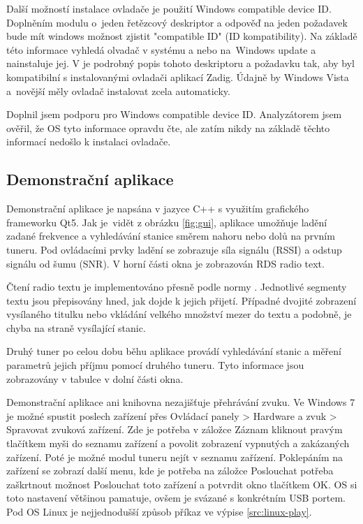 Další možností instalace ovladače je použití Windows compatible device ID. Doplněním modulu o~jeden řetězcový deskriptor a odpověď na jeden požadavek bude mít windows možnost zjistit "compatible ID" (ID kompatibility). Na základě této informace vyhledá olvadač v systému a nebo na~Windows update a nainstaluje jej. V \cite{wcid} je podrobný popis tohoto deskriptoru a požadavku tak, aby byl kompatibilní s instalovanými ovladači aplikací Zadig. Údajně by Windows Vista a~novější měly ovladač instalovat zcela automaticky. 

Doplnil jsem podporu pro Windows compatible device ID. Analyzátorem jsem ověřil, že OS tyto informace opravdu čte, ale zatím nikdy na základě těchto informací nedošlo k instalaci ovladače.

\subsection{Demonstrační aplikace}


Demonstrační aplikace je napsána v jazyce C++ s využitím grafického frameworku Qt5. Jak je~vidět z obrázku \ref{fig:gui}, aplikace umožňuje ladění zadané frekvence a vyhledávání stanice směrem nahoru nebo dolů na prvním tuneru. Pod ovládacími prvky ladění se zobrazuje síla signálu (RSSI) a odstup signálu od šumu (SNR). V horní části okna je zobrazován RDS radio text. 

Čtení radio textu je implementováno přesně podle normy \cite{rds}. Jednotlivé segmenty textu jsou přepisovány hned, jak dojde k jejich přijetí. Případné dvojité zobrazení vysílaného titulku nebo vkládání velkého množství mezer do textu a podobně, je chyba na straně vysílající stanic.

Druhý tuner po celou dobu běhu aplikace provádí vyhledávání stanic a měření parametrů jejich příjmu pomocí druhého tuneru. Tyto informace jsou zobrazovány v tabulce v dolní části okna.

Demonstrační aplikace ani knihovna nezajišťuje přehrávání zvuku. Ve Windows 7 je možné spustit poslech zařízení přes Ovládací panely > Hardware a zvuk > Spravovat zvuková zařízení. Zde je potřeba v záložce Záznam kliknout pravým tlačítkem myši do seznamu zařízení a povolit zobrazení vypnutých a zakázaných zařízení. Poté je možné modul tuneru nejít v seznamu zařízení. Poklepáním na zařízení se zobrazí další menu, kde je potřeba na záložce Poslouchat potřeba zaškrtnout možnost Poslouchat toto zařízení a potvrdit okno tlačítkem OK. OS si toto nastavení většinou pamatuje, ovšem je svázané s konkrétním USB portem. Pod OS Linux je nejjednodušší způsob příkaz ve výpise \ref{src:linux-play}.

